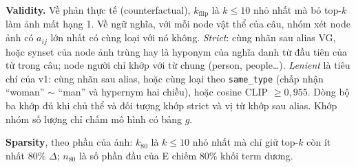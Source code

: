 \textbf{Validity.}
Về phản thực tế (counterfactual), $k_{\text{flip}}$ là $k\le 10$ nhỏ nhất mà bỏ top-$k$ làm ảnh mất hạng 1.
Về ngữ nghĩa, với mỗi node vật thể của câu, nhóm xét node ảnh có $a_{ij}$ lớn nhất có cùng loại với nó không.
\emph{Strict}: cùng nhãn sau alias VG, hoặc synset của node ảnh trùng hay là hyponym của nghĩa danh từ đầu tiên của từ trong câu; node người chỉ khớp với từ chung (person, people\ldots).
\emph{Lenient} là tiêu chí của v1: cùng nhãn sau alias, hoặc cùng loại theo \texttt{same\_type} (chấp nhận ``woman'' $\sim$ ``man'' và hypernym hai chiều), hoặc cosine CLIP $\ge 0{,}955$.
Dòng bộ ba khớp đủ khi chủ thể và đối tượng khớp strict và vị từ khớp sau alias.
Khớp nhóm số lượng chỉ chấm mô hình có bảng $g$.

\textbf{Sparsity}, theo phần của ảnh: $k_{80}$ là $k\le 10$ nhỏ nhất mà chỉ giữ top-$k$ còn ít nhất 80\% $\Delta$; $n_{80}$ là số phần đầu của E chiếm 80\% khối term dương.

